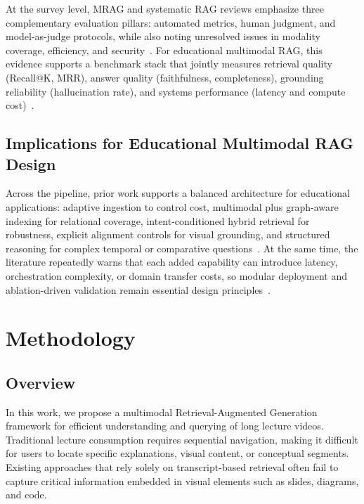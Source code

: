 \documentclass[conference]{IEEEtran}
\begin{document}
    At the survey level, MRAG and systematic RAG reviews emphasize three complementary evaluation pillars: automated metrics, human judgment, and model-as-judge protocols, while also noting unresolved issues in modality coverage, efficiency, and security~\cite{mei2024survey,brown2024systematic}. For educational multimodal RAG, this evidence supports a benchmark stack that jointly measures retrieval quality (Recall@K, MRR), answer quality (faithfulness, completeness), grounding reliability (hallucination rate), and systems performance (latency and compute cost)~\cite{mohsin2024retrieval,mei2024survey,mao2024multi,xu2024evrag,brown2024systematic,rashmi2024multimodal}.

    \subsection{Implications for Educational Multimodal RAG Design}

    Across the pipeline, prior work supports a balanced architecture for educational applications: adaptive ingestion to control cost, multimodal plus graph-aware indexing for relational coverage, intent-conditioned hybrid retrieval for robustness, explicit alignment controls for visual grounding, and structured reasoning for complex temporal or comparative questions~\cite{edge2024local,xia2024mmed,liu2024hmrag,mao2024multi,xu2024evrag,shen2024vgent,rashmi2024multimodal,park2024m3kg}. At the same time, the literature repeatedly warns that each added capability can introduce latency, orchestration complexity, or domain transfer costs, so modular deployment and ablation-driven validation remain essential design principles~\cite{xia2024mmed,singh2024agentic,xu2024evrag,brown2024systematic,liu2024towards}.

    \section{Methodology}

    \subsection{Overview}

    In this work, we propose a multimodal Retrieval-Augmented Generation framework for efficient understanding and querying of long lecture videos. Traditional lecture consumption requires sequential navigation, making it difficult for users to locate specific explanations, visual content, or conceptual segments. Existing approaches that rely solely on transcript-based retrieval often fail to capture critical information embedded in visual elements such as slides, diagrams, and code.
\end{document}
